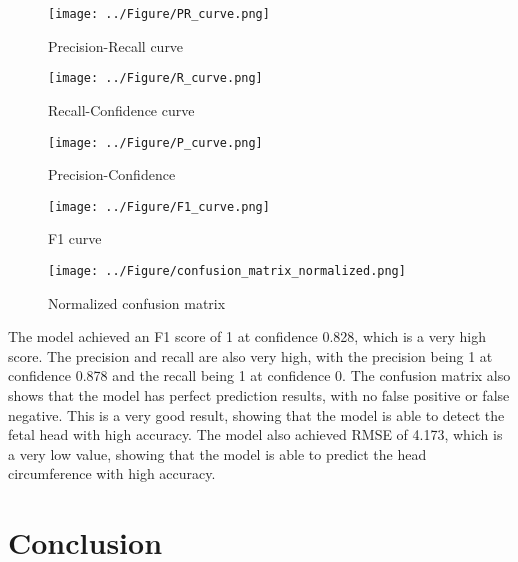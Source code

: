 \documentclass[14pt]{extreport}
\begin{document}
\begin{figure}[H]
    \centering
    \captionsetup{justification=centering}
    \texttt{[image: ../Figure/PR\_curve.png]}
    \caption{Precision-Recall curve}
    \label{precision recall curve}
\end{figure}

\begin{figure}[H]
    \centering
    \captionsetup{justification=centering}
    \texttt{[image: ../Figure/R\_curve.png]}
    \caption{Recall-Confidence curve}
    \label{recall confidence curve}
\end{figure}

\begin{figure}[H]
    \centering
    \captionsetup{justification=centering}
    \texttt{[image: ../Figure/P\_curve.png]}
    \caption{Precision-Confidence}
    \label{precision confidence curve}
\end{figure}

\begin{figure}[H]
    \centering
    \captionsetup{justification=centering}
    \texttt{[image: ../Figure/F1\_curve.png]}
    \caption{F1 curve}
    \label{F1 curve}
\end{figure}

\begin{figure}[!ht]
    \centering
    \captionsetup{justification=centering}
    \texttt{[image: ../Figure/confusion\_matrix\_normalized.png]}
    \caption{Normalized confusion matrix}
    \label{normalized confusion matrix}
\end{figure}

The model achieved an F1 score of 1 at confidence 0.828, which is a very high score. The precision and recall are also very high, with the precision being 1 at confidence 0.878 and the recall being 1 at confidence 0. The confusion matrix also shows that the model has perfect prediction results, with no false positive or false negative. This is a very good result, showing that the model is able to detect the fetal head with high accuracy. The model also achieved RMSE of 4.173, which is a very low value, showing that the model is able to predict the head circumference with high accuracy.

\chapter{Conclusion}
\end{document}
